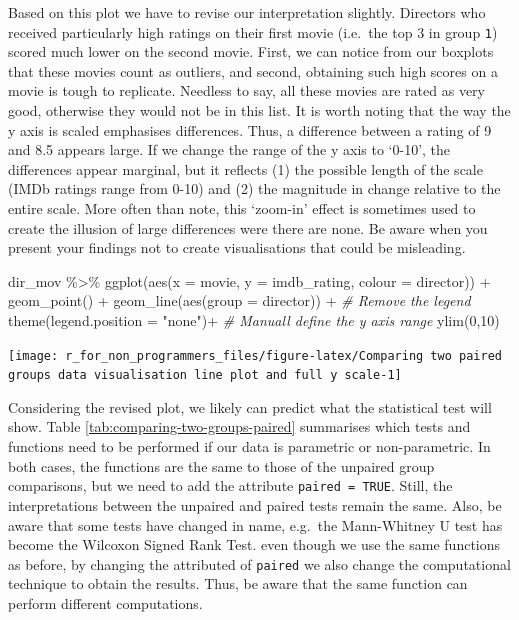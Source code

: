 \documentclass[
]{book}
\newenvironment{Shaded}{\begin{snugshade}}{\end{snugshade}}
\newcommand{\AttributeTok}[1]{\textcolor[rgb]{0.77,0.63,0.00}{#1}}
\newcommand{\CommentTok}[1]{\textcolor[rgb]{0.56,0.35,0.01}{\textit{#1}}}
\newcommand{\DecValTok}[1]{\textcolor[rgb]{0.00,0.00,0.81}{#1}}
\newcommand{\FunctionTok}[1]{\textcolor[rgb]{0.00,0.00,0.00}{#1}}
\newcommand{\NormalTok}[1]{#1}
\newcommand{\SpecialCharTok}[1]{\textcolor[rgb]{0.00,0.00,0.00}{#1}}
\newcommand{\StringTok}[1]{\textcolor[rgb]{0.31,0.60,0.02}{#1}}
\begin{document}
Based on this plot we have to revise our interpretation slightly. Directors who received particularly high ratings on their first movie (i.e.~the top 3 in group \texttt{1}) scored much lower on the second movie. First, we can notice from our boxplots that these movies count as outliers, and second, obtaining such high scores on a movie is tough to replicate. Needless to say, all these movies are rated as very good, otherwise they would not be in this list. It is worth noting that the way the y axis is scaled emphasises differences. Thus, a difference between a rating of 9 and 8.5 appears large. If we change the range of the y axis to `0-10', the differences appear marginal, but it reflects (1) the possible length of the scale (IMDb ratings range from 0-10) and (2) the magnitude in change relative to the entire scale. More often than note, this `zoom-in' effect is sometimes used to create the illusion of large differences were there are none. Be aware when you present your findings not to create visualisations that could be misleading.

\begin{Shaded}
\begin{Highlighting}[]
\NormalTok{dir\_mov }\SpecialCharTok{\%\textgreater{}\%}
  \FunctionTok{ggplot}\NormalTok{(}\FunctionTok{aes}\NormalTok{(}\AttributeTok{x =}\NormalTok{ movie, }\AttributeTok{y =}\NormalTok{ imdb\_rating, }\AttributeTok{colour =}\NormalTok{ director)) }\SpecialCharTok{+}
  \FunctionTok{geom\_point}\NormalTok{() }\SpecialCharTok{+}
  \FunctionTok{geom\_line}\NormalTok{(}\FunctionTok{aes}\NormalTok{(}\AttributeTok{group =}\NormalTok{ director)) }\SpecialCharTok{+}
  \CommentTok{\# Remove the legend}
  \FunctionTok{theme}\NormalTok{(}\AttributeTok{legend.position =} \StringTok{"none"}\NormalTok{)}\SpecialCharTok{+}
  \CommentTok{\# Manuall define the y axis range}
  \FunctionTok{ylim}\NormalTok{(}\DecValTok{0}\NormalTok{,}\DecValTok{10}\NormalTok{)}
\end{Highlighting}
\end{Shaded}

\begin{center}\texttt{[image: r\_for\_non\_programmers\_files/figure-latex/Comparing two paired groups data visualisation line plot and full y scale-1]} \end{center}

Considering the revised plot, we likely can predict what the statistical test will show. Table \ref{tab:comparing-two-groups-paired} summarises which tests and functions need to be performed if our data is parametric or non-parametric. In both cases, the functions are the same to those of the unpaired group comparisons, but we need to add the attribute \texttt{paired\ =\ TRUE}. Still, the interpretations between the unpaired and paired tests remain the same. Also, be aware that some tests have changed in name, e.g.~the Mann-Whitney U test has become the Wilcoxon Signed Rank Test. even though we use the same functions as before, by changing the attributed of \texttt{paired} we also change the computational technique to obtain the results. Thus, be aware that the same function can perform different computations.
\end{document}
